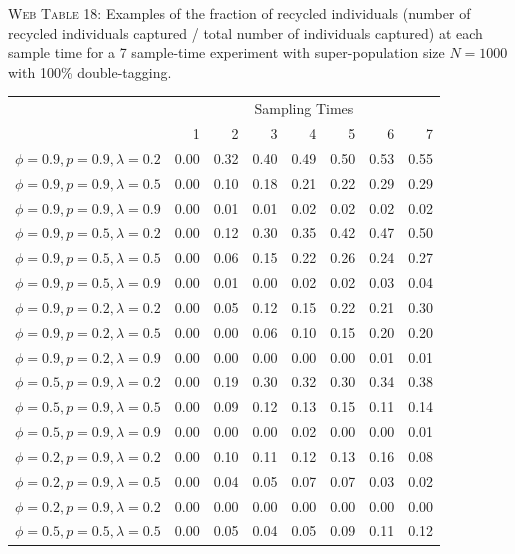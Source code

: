 \documentclass[]{article}
\begin{document}
\textsc{Web Table 18:} Examples of the fraction of recycled individuals
(number of recycled individuals captured / total number of individuals
captured) at each sample time for a 7 sample-time experiment with
super-population size \(N=1000\) with 100\% double-tagging.

\begin{table}[ht]
\begin{tabular}{rrrrrrrr}
  \hline
  & \multicolumn{7}{c}{Sampling Times}\\
 & 1 & 2 & 3 & 4 & 5 & 6 & 7 \\ 
  \hline
  $\phi=0.9, p=0.9, \lambda=0.2$ & 0.00 & 0.32 & 0.40 & 0.49 & 0.50 & 0.53 & 0.55 \\ 
  $\phi=0.9, p=0.9, \lambda=0.5$ & 0.00 & 0.10 & 0.18 & 0.21 & 0.22 & 0.29 & 0.29 \\ 
  $\phi=0.9, p=0.9, \lambda=0.9$ & 0.00 & 0.01 & 0.01 & 0.02 & 0.02 & 0.02 & 0.02 \\ \hline
  $\phi=0.9, p=0.5, \lambda=0.2$ & 0.00 & 0.12 & 0.30 & 0.35 & 0.42 & 0.47 & 0.50 \\ 
  $\phi=0.9, p=0.5, \lambda=0.5$ & 0.00 & 0.06 & 0.15 & 0.22 & 0.26 & 0.24 & 0.27 \\ 
  $\phi=0.9, p=0.5, \lambda=0.9$ & 0.00 & 0.01 & 0.00 & 0.02 & 0.02 & 0.03 & 0.04 \\ \hline
  $\phi=0.9, p=0.2, \lambda=0.2$ & 0.00 & 0.05 & 0.12 & 0.15 & 0.22 & 0.21 & 0.30 \\ 
  $\phi=0.9, p=0.2, \lambda=0.5$ & 0.00 & 0.00 & 0.06 & 0.10 & 0.15 & 0.20 & 0.20 \\ 
  $\phi=0.9, p=0.2, \lambda=0.9$ & 0.00 & 0.00 & 0.00 & 0.00 & 0.00 & 0.01 & 0.01 \\ \hline
  $\phi=0.5, p=0.9, \lambda=0.2$ & 0.00 & 0.19 & 0.30 & 0.32 & 0.30 & 0.34 & 0.38 \\ 
  $\phi=0.5, p=0.9, \lambda=0.5$ & 0.00 & 0.09 & 0.12 & 0.13 & 0.15 & 0.11 & 0.14 \\ 
  $\phi=0.5, p=0.9, \lambda=0.9$ & 0.00 & 0.00 & 0.00 & 0.02 & 0.00 & 0.00 & 0.01 \\ \hline
  $\phi=0.2, p=0.9, \lambda=0.2$ & 0.00 & 0.10 & 0.11 & 0.12 & 0.13 & 0.16 & 0.08 \\ 
  $\phi=0.2, p=0.9, \lambda=0.5$ & 0.00 & 0.04 & 0.05 & 0.07 & 0.07 & 0.03 & 0.02 \\ 
  $\phi=0.2, p=0.9, \lambda=0.2$ & 0.00 & 0.00 & 0.00 & 0.00 & 0.00 & 0.00 & 0.00 \\ \hline
    $\phi=0.5, p=0.5, \lambda=0.5$ & 0.00 & 0.05 & 0.04 & 0.05 & 0.09 & 0.11 & 0.12 \\ \hline
\end{tabular}
\end{table}
\end{document}
